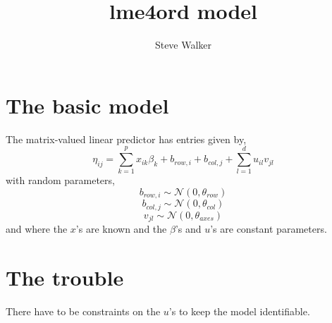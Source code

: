 \documentclass{article}
\title{lme4ord model}
\author{Steve Walker}
\date{}
\newcommand{\mat}{\bm}
\newcommand{\trans}{^\top}
\newcommand{\dnorm}{\mathcal{N}}
\begin{document}
\maketitle



\section{The basic model}

The matrix-valued linear predictor has entries given by,
\begin{equation}
  \label{eq:3}
  \eta_{ij} = \sum_{k = 1}^p x_{ik}\beta_{k} + b_{row, i} + b_{col, j} + \sum_{l = 1}^d u_{il}v_{jl}
\end{equation}
with random parameters,
\begin{equation}
  \label{eq:4}
  b_{row, i} \sim \dnorm(0, \theta_{row})
\end{equation}
\begin{equation}
  \label{eq:4}
  b_{col, j} \sim \dnorm(0, \theta_{col})
\end{equation}
\begin{equation}
  \label{eq:5}
  v_{jl} \sim \dnorm(0, \theta_{axes})
\end{equation}
and where the $x$'s are known and the $\beta$'s and $u$'s are constant parameters.

\section{The trouble}

There have to be constraints on the $u$'s to keep the model identifiable. 
\end{document}
